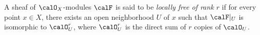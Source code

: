     \begin{definition}\label{def:locally_free_O_X_modules}
        A sheaf of \(\calO_X\)-modules \(\calF\) is said to be \emph{locally free of rank \(r\)} if for every point \(x \in X\), there exists an open neighborhood \(U\) of \(x\) such that \(\calF|_U\) is isomorphic to \(\calO_U^r\), 
        where \(\calO_U^r\) is the direct sum of \(r\) copies of \(\calO_U\).
    \end{definition}

        




